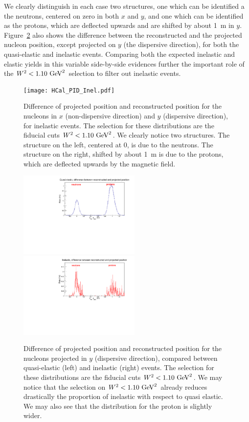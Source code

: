 %
We clearly distinguish in each case two structures, one which can be identified a the neutrons, centered on zero in both $x$ and $y$, and one which can be identified as the protons, which are deflected upwards and are shifted by about 1~m in $y$.
Figure~\ref{hcal_id_y} also shows the difference between the reconstructed and the projected nucleon position, except projected on $y$ (the dispersive direction), for both the quasi-elastic and inelastic events. Comparing both the expected inelastic and elastic yields in this variable side-by-side evidences further the important role of the $W^2<1.10~{\rm GeV}^2$ selection to filter out inelastic events. 
%
\begin{figure}[!h]
  \centering
    \texttt{[image: HCal\_PID\_Inel.pdf]}
    \caption{Difference of projected position and reconstructed position for the nucleons in $x$ (non-dispersive direction) and $y$ (dispersive direction), for inelastic events. The selection for these distributions are the fiducial cuts $W^2<1.10~{\rm GeV}^2$. We clearly notice two structures. The structure on the left, centered at 0, is due to the neutrons. The structure on the right, shifted by about 1~m is due to the protons, which are deflected upwards by the magnetic field. 
    }
    \label{hcal_id_inel}
\end{figure}
%
\begin{figure}[!h]
  \centering
    \includegraphics[width=6cm]{Answers_Readers/HCal_PID_QE_y.pdf}
    \includegraphics[width=6cm]{Answers_Readers/HCal_PID_Inel_y.pdf}
    \caption{Difference of projected position and reconstructed position for the nucleons projected in $y$ (dispersive direction), compared between quasi-elastic (left) and inelastic (right) events. The selection for these distributions are the fiducial cuts $W^2<1.10~{\rm GeV}^2$. We may notice that the selection on $W^2<1.10~{\rm GeV}^2$ already reduces drastically the proportion of inelastic with respect to quasi elastic. We may also see that the distribution for the proton is slightly wider. %
    }
    \label{hcal_id_y}
\end{figure}
%

